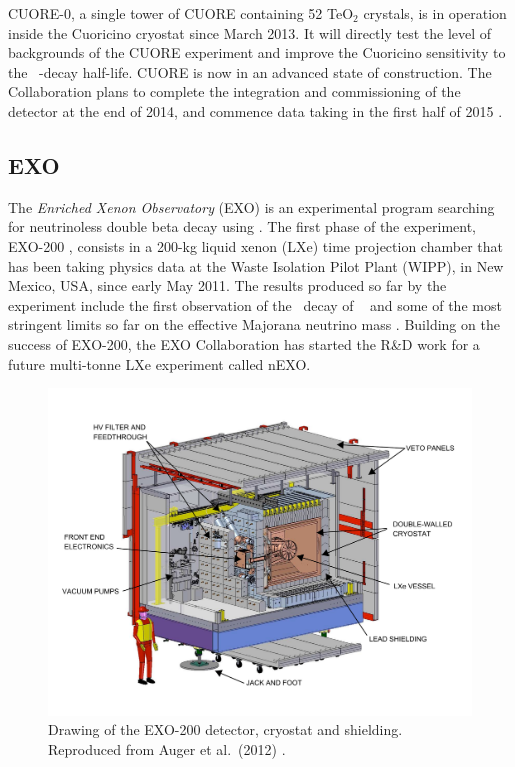 \documentclass{PoS}
\begin{document}
CUORE-0, a single tower of CUORE containing 52 TeO$_{2}$ crystals, is in operation inside the Cuoricino cryostat since March 2013. It will directly test the level of backgrounds of the CUORE experiment and improve the Cuoricino sensitivity to the \TE\ \bbonu-decay half-life. CUORE is now in an advanced state of construction. The Collaboration plans to complete the integration and commissioning of the detector at the end of 2014, and commence data taking in the first half of 2015 \cite{Artusa:2014lgv}.


\subsection{EXO} \label{subsec:EXO}
The \emph{Enriched Xenon Observatory} (EXO) is an experimental program searching for neutrinoless double beta decay using \XE. The first phase of the experiment, EXO-200 \cite{Auger:2012gs}, consists in a 200-kg liquid xenon (LXe) time projection chamber that has been taking physics data at the Waste Isolation Pilot Plant (WIPP), in New Mexico, USA, since early May 2011. The results produced so far by the experiment include the first observation of the \bbtnu\ decay of \XE\ \cite{Albert:2013gpz} and some of the most stringent limits so far on the effective Majorana neutrino mass \cite{Auger:2012ar, Albert:2014awa}. Building on the success of EXO-200, the EXO Collaboration has started the R\&D work for a future multi-tonne LXe experiment called nEXO.  

\begin{figure}
\centering
\includegraphics[width=\textwidth]{img/EXO200Cleanroom.pdf}
\caption{Drawing of the EXO-200 detector, cryostat and shielding. Reproduced from Auger et al.\ (2012) \cite{Auger:2012gs}.} \label{fig:EXO200}
\end{figure}
\end{document}
